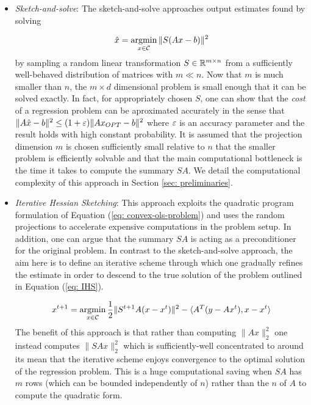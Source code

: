 \begin{itemize}
  \item \textit{Sketch-and-solve}:
  The sketch-and-solve approaches output estimates found by solving

  \begin{equation}
    \hat{x} = \operatorname*{argmin}_{x \in \mathcal{C}} \| S(Ax - b) \|^2
  \end{equation}
  by sampling a random linear transformation $S \in \mathbb{R}^{m \times n}$ from a
  sufficiently well-behaved distribution of matrices with $m \ll n$.
  Now that $m$ is much smaller than $n$, the $m \times d$ dimensional problem
  is small enough that it can be solved exactly.
  In fact, for appropriately chosen $S$, one can show that the \textit{
  cost} of a regression problem can be aproximated accurately in the sense
  that $\| A  \hat{x} - b \|^2 \le (1 + \varepsilon) \|A x_{OPT} - b\|^2$ where
  $\varepsilon$ is an accuracy parameter and the result holds with high constant
  probability.
  It is assumed that the projection dimension $m$ is chosen sufficiently small
  relative to $n$ that the smaller problem is efficiently solvable and that
  the main computational bottleneck is the time it takes to compute the
  summary $SA$.
  We detail the computational complexity of this approach in Section
  \ref{sec: preliminaries}.

  \item \textit{Iterative Hessian Sketching}:
  This approach exploits the quadratic program formulation of Equation
  (\ref{eq: convex-ols-problem}) and uses the random projections to accelerate
  expensive computations in the problem setup.
  In addition, one can argue that the summary $SA$ is acting as a preconditioner
  for the original problem.
  In contrast to the sketch-and-solve approach, the aim here is to define an
  iterative scheme through which one gradually refines the estimate in order
  to descend to the true solution of the problem outlined in Equation (\ref{eq: IHS}).

  \begin{equation} \label{eq: IHS}
    x^{t+1} = \operatorname*{argmin}_{x \in \mathcal{C}}  \frac{1}{2} \|S^{t+1} A
    (x - x^t) \|^2 - \langle A^T (y - Ax^t), x - x^t \rangle
  \end{equation}
  The benefit of this approach is that rather than computing $\|Ax\|_2^2$ one
  instead computes $\| SAx \|_2^2$ which is sufficiently-well concentrated to
  around its mean that the iterative scheme enjoys
  convergence to the optimal solution of the regression problem.
  This is a huge computational saving when $SA$ has $m$ rows (which can be bounded
  independently of $n$) rather than the $n$ of $A$ to compute the quadratic form.

\end{itemize}

